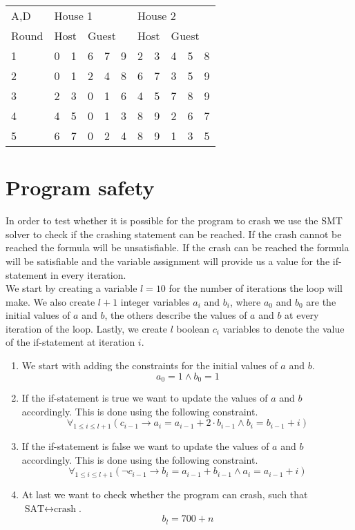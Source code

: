 \documentclass{scrartcl}
\begin{document}
\begin{itemize}
\begin{tabular}{l|ll|lll|ll|lll}
A,D & \multicolumn{5}{l|}{House 1} & \multicolumn{5}{l}{House 2} \\
Round & \multicolumn{2}{l}{Host} & \multicolumn{3}{l|}{Guest} & \multicolumn{2}{l}{Host} & \multicolumn{3}{l}{Guest} \\ \hline
1 & 0 & 1 & 6 & 7 & 9 & 2 & 3 & 4 & 5 & 8 \\
2 & 0 & 1 & 2 & 4 & 8 & 6 & 7 & 3 & 5 & 9 \\
3 & 2 & 3 & 0 & 1 & 6 & 4 & 5 & 7 & 8 & 9 \\
4 & 4 & 5 & 0 & 1 & 3 & 8 & 9 & 2 & 6 & 7 \\
5 & 6 & 7 & 0 & 2 & 4 & 8 & 9 & 1 & 3 & 5 \\
\end{tabular}
	
\end{itemize}

\section{Program safety}
In order to test whether it is possible for the program to crash we use the SMT
solver to check if the crashing statement can be reached. If the crash cannot
be reached the formula will be unsatisfiable. If the crash can be reached the
formula will be satisfiable and the variable assignment will provide us a value
for the if-statement in every iteration.
\\

We start by creating a variable $l = 10$ for the number of iterations the loop
will make. We also create $l + 1$ integer variables $a_i$ and $b_i$, where
$a_0$ and $b_0$ are the initial values of $a$ and $b$, the others describe the
values of $a$ and $b$ at every iteration of the loop. Lastly, we create $l$
boolean $c_i$ variables to denote the value of the if-statement at iteration
$i$.

\begin{enumerate}
	\item
		We start with adding the constraints for the initial values of $a$ and $b$.
		$$a_0 = 1 \land b_0 = 1$$

	\item
		If the if-statement is true we want to update the values of $a$ and $b$
		accordingly. This is done using the following constraint.
		\[
			\forall_{1 \leq i \leq l + 1}
			\left ( c_{i-1} \to
				a_i = a_{i-1} + 2 \cdot b_{i-1} \land
				b_i = b_{i-1} + i
			\right )
		\]
	\item
		If the if-statement is false we want to update the values of $a$ and $b$
		accordingly. This is done using the following constraint.
		\[
			\forall_{1 \leq i \leq l + 1}
			\left ( \lnot c_{i-1} \to
				b_i = a_{i-1} + b_{i-1} \land
				a_i = a_{i-1} + i
			\right )
		\]
	\item
		At last we want to check whether the program can crash, such that
		$\text{SAT} \leftrightarrow \text{crash}$.
		\[ b_l = 700 + n \]
\end{enumerate}
\end{document}
